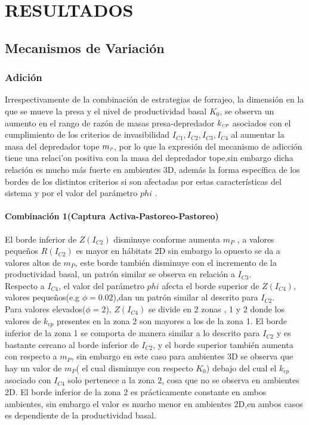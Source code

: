 \section{RESULTADOS}

\subsection{Mecanismos de Variaci\'on}

\subsubsection{Adici\'on}
Irrespectivamente de la combinaci\'on de estrategias de forrajeo, la dimensi\'on en la que se mueve la presa y el nivel de productividad basal $K_0$, se observa un aumento en el rango de raz\'on de masas presa-depredador $k_{\textit{\tiny CP}}$ asociados con el cumplimiento de los criterios de invasibilidad $I_{C1},I_{C2},I_{C3},I_{C4}$ al aumentar la masa del depredador tope $m_{\textit{\tiny P}}$, por lo que la expresi\'on del mecanismo de adicci\'on tiene una relaci'on positiva con la masa del depredador tope,sin embargo dicha relaci\'on es mucho m\'as fuerte en ambientes 3D, adem\'as la forma espec\'ifica de los bordes de los distintos criterios si son afectadas por estas caracter\'isticas del sistema y por el valor del par\'ametro $phi$ .

\paragraph*{Combinaci\'on 1(Captura Activa-Pastoreo-Pastoreo)} El borde inferior de $Z(I_{C2})$ disminuye conforme aumenta $m_P$ , a valores peque\~nos $R(I_{C2})$ es mayor en h\'abitats 2D sin embargo lo opuesto se da a valores altos de $m_P$, este borde tambi\'en disminuye con el incremento de la productividad basal, un patr\'on similar se observa en relaci\'on a $I_{C3}$. \\
Respecto a $I_{C4}$, el valor del par\'ametro $phi$ afecta el borde superior de $Z(I_{C4})$, valores peque\~nos(e.g $\phi = 0.02$),dan un patr\'on similar al descrito para $I_{C2}$.\\
Para valores elevados($\phi = 2$), $Z(I_{C4})$ se divide en 2 zonas , 1 y 2 donde los valores de $k_{cp}$ presentes en la zona 2 son mayores a los de la zona 1. El borde inferior de la zona 1 se comporta de manera similar a lo descrito para $I_{C2}$ y es bastante cercano al borde inferior de $I_{C2}$, y el borde superior tambi\'en aumenta con respecto a $m_P$, sin embargo en este caso para ambientes 3D se observa que hay un valor de $m_P$( el cual disminuye con respecto $K_0$) debajo del cual el $k_{cp}$ asociado con $I_{C4}$ solo pertenece a la zona 2, cosa que no se observa en ambientes 2D. El borde inferior de la zona 2 es pr\'acticamente constante en ambos ambientes, sin embargo el valor es mucho menor en ambientes 2D,en ambos casos es dependiente de la productividad basal.

